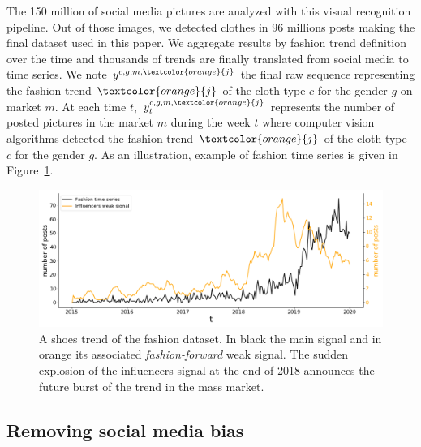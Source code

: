 \documentclass[10pt]{article} %
\begin{document}
The 150 million of social media pictures are analyzed with this visual recognition pipeline. Out of those images, we detected clothes in 96 millions posts making the final dataset used in this paper. We aggregate results by fashion trend definition over the time and  thousands of trends are finally translated from social media to time series. We note $y^{c,g,m,\textcolor{orange}{j}}$ the final raw sequence representing the fashion trend $\textcolor{orange}{j}$ of the cloth type $c$ for the gender $g$ on market $m$. At each time $t$, $y^{c,g,m,\textcolor{orange}{j}}_t$ represents the number of posted pictures in the market $m$ during the week $t$ where computer vision algorithms detected the fashion trend $\textcolor{orange}{j}$ of the cloth type $c$ for the gender $g$. As an illustration, example of fashion time series is given in Figure~\ref{fig:oneemergingtrend}.

\begin{figure}
  \centering
    \includegraphics[width=1.\linewidth]{br_female_shoes_262}
  \caption{A shoes trend of the fashion dataset. In black the main signal and in orange its associated \textit{fashion-forward} weak signal. The sudden explosion of the influencers signal at the end of 2018 announces the future burst of the trend in the mass market.}
\label{fig:oneemergingtrend}
\end{figure}

\subsection{Removing social media bias}
\label{sec:dataset:b}
\end{document}
